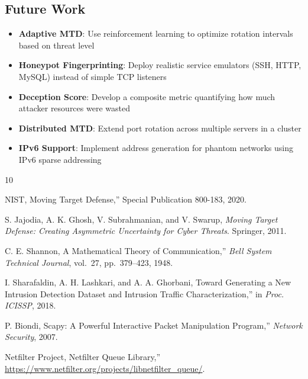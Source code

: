\documentclass[12pt,a4paper]{article}
\begin{document}
\subsection{Future Work}

\begin{itemize}[leftmargin=*, itemsep=3pt]
    \item \textbf{Adaptive MTD}: Use reinforcement learning to optimize rotation intervals based on threat level
    \item \textbf{Honeypot Fingerprinting}: Deploy realistic service emulators (SSH, HTTP, MySQL) instead of simple TCP listeners
    \item \textbf{Deception Score}: Develop a composite metric quantifying how much attacker resources were wasted
    \item \textbf{Distributed MTD}: Extend port rotation across multiple servers in a cluster
    \item \textbf{IPv6 Support}: Implement address generation for phantom networks using IPv6 sparse addressing
\end{itemize}

\begin{thebibliography}{10}
\small

NIST, Moving Target Defense,'' Special Publication 800-183, 2020.

S. Jajodia, A. K. Ghosh, V. Subrahmanian, and V. Swarup, \emph{Moving Target Defense: Creating Asymmetric Uncertainty for Cyber Threats}. Springer, 2011.

C. E. Shannon, A Mathematical Theory of Communication,'' \emph{Bell System Technical Journal}, vol.~27, pp.~379--423, 1948.

I. Sharafaldin, A. H. Lashkari, and A. A. Ghorbani, Toward Generating a New Intrusion Detection Dataset and Intrusion Traffic Characterization,'' in \emph{Proc. ICISSP}, 2018.

P. Biondi, Scapy: A Powerful Interactive Packet Manipulation Program,'' \emph{Network Security}, 2007.

Netfilter Project, Netfilter Queue Library,'' \url{https://www.netfilter.org/projects/libnetfilter_queue/}.

\end{thebibliography}
\end{document}
